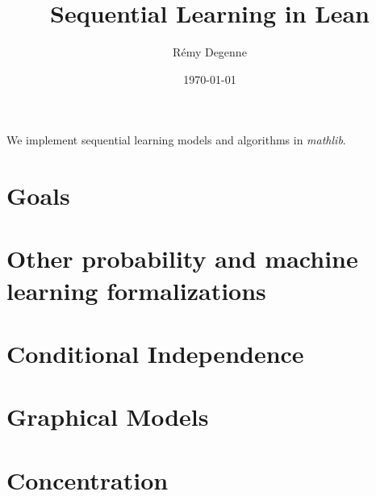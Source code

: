 \documentclass{article}
\title{Sequential Learning in Lean}
\author{Rémy Degenne}
\date{\today}
\begin{document}
\maketitle

We implement sequential learning models and algorithms in \emph{mathlib}.

\section{Goals}



\section{Other probability and machine learning formalizations}
\label{sec:other_probability_and_machine_learning_formalizations}



\section{Conditional Independence}
\label{sec:conditional_independence}



\section{Graphical Models}
\label{sec:graphical_models}



\section{Concentration}
\label{sec:concentration}








\end{document}
